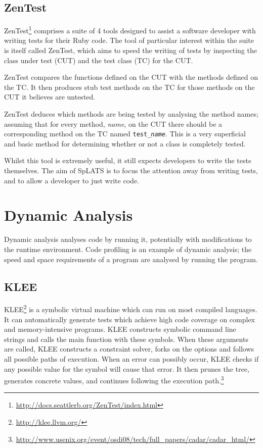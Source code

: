   \subsection{ZenTest}
    ZenTest\footnote{\url{http://docs.seattlerb.org/ZenTest/index.html}}
comprises a suite of 4 tools designed to assist a software developer with
writing tests for their Ruby code. The tool of particular interest within the suite is itself called ZenTest,
which aims to speed the writing of tests by inspecting the class under test (CUT)
and the test class (TC) for the CUT.

    ZenTest compares the functions defined on the CUT with the methods defined
on the TC. It then produces stub test methods on the TC for those methods on the
CUT it believes are untested.

ZenTest deduces which methods are being tested by analysing the method names; assuming that for every method, \emph{name}, on the CUT there should be a corresponding method on the TC named \texttt{test\_\emph{name}}. This is a very superficial and basic method for determining whether or not a class is completely tested.

    Whilst this tool is extremely useful, it still expects developers to write
the tests themselves. The aim of SpLATS is to focus the attention away from
writing tests, and to allow a developer to just write code.

\section{Dynamic Analysis} 

  Dynamic analysis analyses code by running it, potentially with modifications
  to the runtime environment. Code profiling is an example of dynamic analysis;
  the speed and space requirements of a program are analysed by running the
  program.
  
  \subsection{KLEE}
  KLEE\footnote{\url{http://klee.llvm.org/}} is a symbolic virtual machine which can run on most compiled languages. It can automatically generate tests which achieve high code coverage on complex and memory-intensive programs. KLEE constructs symbolic command line strings and calls the main function with these symbols. When these arguments are called, KLEE constructs a constraint solver, forks on the options and follows all possible paths of execution. When an error can possibly occur, KLEE checks if any possible value for the symbol will cause that error. It then prunes the tree, generates concrete values, and continues following the execution path.\footnote{\url{http://www.usenix.org/event/osdi08/tech/full_papers/cadar/cadar_html/}}

